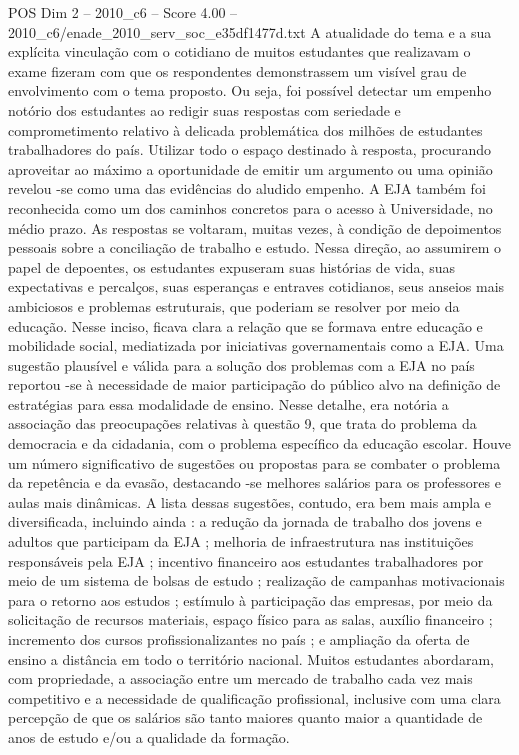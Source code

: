 \begin{textsample}{POS Dim 2 – 2010\_c6 – Score 4.00 – 2010\_c6/enade\_2010\_serv\_soc\_e35df1477d.txt}
A atualidade do tema e a sua explícita vinculação com o cotidiano de muitos estudantes que realizavam o exame fizeram com que os respondentes demonstrassem um visível grau de envolvimento com o tema proposto.
Ou seja, foi possível detectar um empenho notório dos estudantes ao redigir suas respostas com seriedade e comprometimento relativo à delicada problemática dos milhões de estudantes trabalhadores do país.
Utilizar todo o espaço destinado à resposta, procurando aproveitar ao máximo a oportunidade de emitir um argumento ou uma opinião revelou -se como uma das evidências do aludido empenho.
A EJA também foi reconhecida como um dos caminhos concretos para o acesso à Universidade, no médio prazo.
As respostas se voltaram, muitas vezes, à condição de depoimentos pessoais sobre a conciliação de trabalho e estudo.
Nessa direção, ao assumirem o papel de depoentes, os estudantes expuseram suas histórias de vida, suas expectativas e percalços, suas esperanças e entraves cotidianos, seus anseios mais ambiciosos e problemas estruturais, que poderiam se resolver por meio da educação.
Nesse inciso, ficava clara a relação que se formava entre educação e mobilidade social, mediatizada por iniciativas governamentais como a EJA.
Uma sugestão plausível e válida para a solução dos problemas com a EJA no país reportou -se à necessidade de maior participação do público alvo na definição de estratégias para essa modalidade de ensino.
Nesse detalhe, era notória a associação das preocupações relativas à questão 9, que trata do problema da democracia e da cidadania, com o problema específico da educação escolar.
Houve um número significativo de sugestões ou propostas para se combater o problema da repetência e da evasão, destacando -se melhores salários para os professores e aulas mais dinâmicas.
A lista dessas sugestões, contudo, era bem mais ampla e diversificada, incluindo ainda : a redução da jornada de trabalho dos jovens e adultos que participam da EJA ; melhoria de infraestrutura nas instituições responsáveis pela EJA ; incentivo financeiro aos estudantes trabalhadores por meio de um sistema de bolsas de estudo ; realização de campanhas motivacionais para o retorno aos estudos ; estímulo à participação das empresas, por meio da solicitação de recursos materiais, espaço físico para as salas, auxílio financeiro ; incremento dos cursos profissionalizantes no país ; e ampliação da oferta de ensino a distância em todo o território nacional.
Muitos estudantes abordaram, com propriedade, a associação entre um mercado de trabalho cada vez mais competitivo e a necessidade de qualificação profissional, inclusive com uma clara percepção de que os salários são tanto maiores quanto maior a quantidade de anos de estudo e/ou a qualidade da formação.

\end{textsample}
